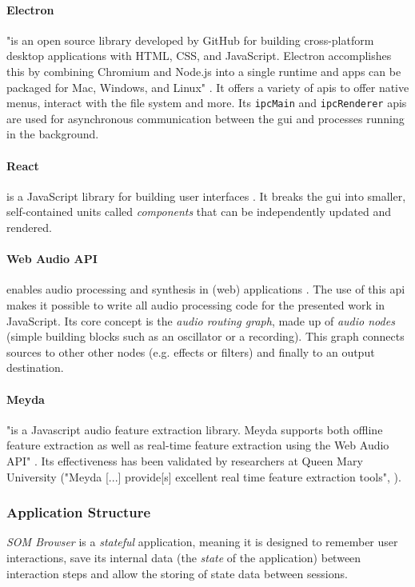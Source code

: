 \paragraph*{Electron}
\label{para:electron}
"is an open source library developed by GitHub for building cross-platform
desktop applications with HTML, CSS, and JavaScript. Electron accomplishes this
by combining Chromium and Node.js into a single runtime and apps can be
packaged for Mac, Windows, and Linux" \citep{electron2019}. It offers a variety
of \glspl{api} to offer native menus, interact with the file system and more.
Its \texttt{ipcMain} and \texttt{ipcRenderer} \glspl{api} are used for
asynchronous communication between the \gls{gui} and processes running in the
background.

\paragraph*{React}
\label{para:react}
is a JavaScript library for building user interfaces \citep{react2019}. It
breaks the \gls{gui} into smaller, self-contained units called
\textit{components} that can be independently updated and rendered.

\paragraph*{Web Audio API}
\label{para:web_audio_api}
enables audio processing and synthesis in (web) applications
\citep{webaudio2019}. The use of this \gls{api} makes it possible to write all
audio processing code for the presented work in JavaScript. Its core concept is
the \textit{audio routing graph}, made up of \textit{audio nodes} (simple
building blocks such as an oscillator or a recording). This graph connects
sources to other other nodes (e.g. effects or filters) and finally to an output
destination.

\paragraph*{Meyda}
\label{para:meyda}
"is a Javascript audio feature extraction library. Meyda supports both offline
feature extraction as well as real-time feature extraction using the Web Audio
API" \citep{web:meyda2019}. Its effectiveness has been validated by researchers
at Queen Mary University ("Meyda [...] provide[s] excellent real time feature
extraction tools", \citet{moffat2015}).

\subsubsection{Application Structure}
\label{subsubsec:som-browser_structure}
\textit{SOM Browser} is a \textit{stateful} application, meaning it is designed
to remember user interactions, save its internal data (the \textit{state} of
the application) between interaction steps and allow the storing of state data
between sessions.

